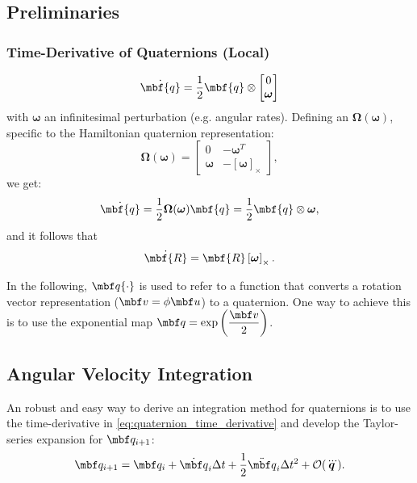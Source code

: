 \documentclass[10pt,a4paper]{article}
\newcommand{\mbs}[1]{{\boldsymbol{#1}}}
\numberwithin{equation}{section}
\begin{document}
\subsection{Preliminaries}

\subsubsection{Time-Derivative of Quaternions (Local)}
\begin{equation}
\dot{\mbf{q}} = \dfrac{1}{2} \mbf{q} \otimes
\begin{bmatrix}
0 \\ \mbs{\omega}
\end{bmatrix}
\end{equation}
with $\mbs{\omega}$ an infinitesimal perturbation (e.g. angular rates). Defining an $\mbs \Omega(\mbs \omega)$, specific to the Hamiltonian quaternion representation:
\begin{equation}
\bm{\Omega}(\mbs{\omega}) = \begin{bmatrix}
0 & -\mbs{\omega}^T \\ \mbs{\omega} & -\left[ \mbs{\omega} \right]_{\times}
\end{bmatrix},
\end{equation}
we get:
\begin{equation}
\dot{\mbf{q}} = \dfrac{1}{2}\mbs{\Omega}(\mbs{\omega}){\mbf{q}}
= \dfrac{1}{2} \mbf{q} \otimes \mbs{\omega},
\label{eq:quaternion_time_derivative}
\end{equation}
and it follows that
\begin{equation}
\dot{\mbf{R}} = \mbf{R}\left[ \mbs{\omega} \right]_\times.
\end{equation}

In the following, $\mbf q \lbrace \cdot \rbrace$ is used to refer to a function that converts a rotation vector representation ($\mbf v = \phi \mbf u$) to a quaternion. One way to achieve this is to use the exponential map $\mbf q = \exp \left( \dfrac{\mbf v}{2} \right)$.


\subsection{Angular Velocity Integration}
An robust and easy way to derive an integration method for quaternions is to use the time-derivative in \eqref{eq:quaternion_time_derivative} and develop the Taylor-series expansion for $\mbf q_{i+1}$:
\begin{equation}
\mbf q_{i+1} = \mbf q_i + \dot{\mbf q}_i \Delta t + \dfrac{1}{2} \ddot{\mbf q}_i \Delta t^2 + \mathcal{O}(\dddot{\mbs q}).
\label{eq:quaternion_taylor_series}
\end{equation}
\end{document}
